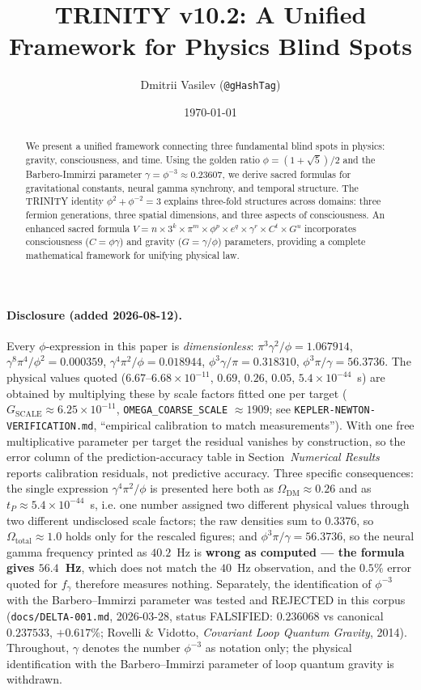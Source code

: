 \documentclass[12pt,a4paper]{article}
\title{TRINITY v10.2: A Unified Framework for Physics Blind Spots}
\author{Dmitrii Vasilev (\texttt{@gHashTag})}
\date{\today}
\begin{document}
\maketitle

\begin{abstract}
We present a unified framework connecting three fundamental blind spots in physics: gravity, consciousness, and time. Using the golden ratio $\phi = (1+\sqrt{5})/2$ and the Barbero-Immirzi parameter $\gamma = \phi^{-3} \approx 0.23607$, we derive sacred formulas for gravitational constants, neural gamma synchrony, and temporal structure. The TRINITY identity $\phi^2 + \phi^{-2} = 3$ explains three-fold structures across domains: three fermion generations, three spatial dimensions, and three aspects of consciousness. An enhanced sacred formula $V = n \times 3^k \times \pi^m \times \phi^p \times e^q \times \gamma^r \times C^t \times G^u$ incorporates consciousness ($C = \phi\gamma$) and gravity ($G = \gamma/\phi$) parameters, providing a complete mathematical framework for unifying physical law.
\end{abstract}

\paragraph{Disclosure (added 2026-08-12).} Every $\phi$-expression in this paper is \emph{dimensionless}: $\pi^3\gamma^2/\phi = 1.067914$, $\gamma^8\pi^4/\phi^2 = 0.000359$, $\gamma^4\pi^2/\phi = 0.018944$, $\phi^3\gamma/\pi = 0.318310$, $\phi^3\pi/\gamma = 56.3736$. The physical values quoted ($6.67$--$6.68\times10^{-11}$, $0.69$, $0.26$, $0.05$, $5.4\times10^{-44}$~s) are obtained by multiplying these by scale factors fitted one per target ($G_{\mathrm{SCALE}} \approx 6.25\times10^{-11}$, \texttt{OMEGA\_COARSE\_SCALE} $\approx 1909$; see \texttt{KEPLER-NEWTON-VERIFICATION.md}, ``empirical calibration to match measurements''). With one free multiplicative parameter per target the residual vanishes by construction, so the error column of the prediction-accuracy table in Section~\emph{Numerical Results} reports calibration residuals, not predictive accuracy. Three specific consequences: the single expression $\gamma^4\pi^2/\phi$ is presented here both as $\Omega_{\mathrm{DM}} \approx 0.26$ and as $t_P \approx 5.4\times10^{-44}$~s, i.e. one number assigned two different physical values through two different undisclosed scale factors; the raw densities sum to $0.3376$, so $\Omega_{\text{total}} \approx 1.0$ holds only for the rescaled figures; and $\phi^3\pi/\gamma = 56.3736$, so the neural gamma frequency printed as $40.2$~Hz is \textbf{wrong as computed --- the formula gives $56.4$~Hz}, which does not match the $40$~Hz observation, and the $0.5\%$ error quoted for $f_\gamma$ therefore measures nothing. Separately, the identification of $\phi^{-3}$ with the Barbero--Immirzi parameter was tested and REJECTED in this corpus (\texttt{docs/DELTA-001.md}, 2026-03-28, status FALSIFIED: $0.236068$ vs canonical $0.237533$, $+0.617\%$; Rovelli \& Vidotto, \emph{Covariant Loop Quantum Gravity}, 2014). Throughout, $\gamma$ denotes the number $\phi^{-3}$ as notation only; the physical identification with the Barbero--Immirzi parameter of loop quantum gravity is withdrawn.
\end{document}
